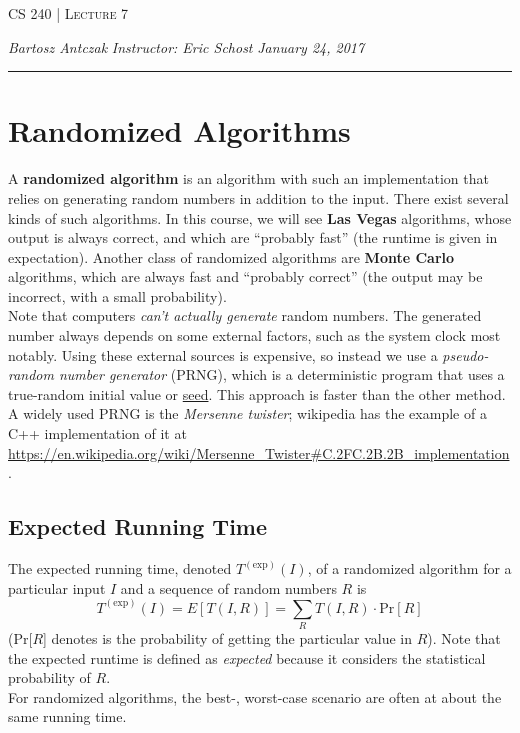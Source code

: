 \documentclass{report}
\newcommand{\lectureNum}{7}
\newcommand{\curDate}{January 24, 2017}
\newcommand{\course}{CS 240}
\begin{document}
\begin{center}
\begin{Large}
\textsc{\course{} | Lecture \lectureNum{}}
\end{Large}
\end{center} 
\noindent \textit{Bartosz Antczak} \hfill
\textit{Instructor: Eric Schost} \hfill
\textit{\curDate{}}
\rule{\textwidth}{0.4pt}

\section{Randomized Algorithms}
A \textbf{randomized algorithm} is an algorithm with such an implementation that relies on generating random numbers in addition to the input.
There exist several kinds of such algorithms. In this course, we will see {\bf Las Vegas} algorithms, whose output is 
always correct, and which are ``probably fast'' (the runtime is given in expectation). Another class of randomized 
algorithms are {\bf Monte Carlo} algorithms, which are always fast and ``probably correct'' (the output 
may be incorrect, with a small probability).\\


Note that computers \textit{can't actually generate} random
numbers. The generated number always depends on some external factors,
such as the system clock most notably. Using these external sources is
expensive, so instead we use a \textit{pseudo-random number generator}
(PRNG), which is a deterministic program that uses a true-random
initial value or \underline{seed}. This approach is faster than the
other method. A widely used PRNG is the {\it Mersenne twister}; 
wikipedia has the example of a C++ implementation of it at
\url{https://en.wikipedia.org/wiki/Mersenne_Twister#C.2FC.2B.2B_implementation}.



\subsection{Expected Running Time}
The expected running time, denoted $T^{(\mathrm{exp})}(I)$, of a randomized algorithm for a particular input $I$ and a sequence of random numbers $R$ is
$$T^{(\mathrm{exp})}(I) = E[T(I,R)] = \sum_{R} T(I, R) \cdot \mathrm{Pr}[R]$$
(Pr[$R$] denotes is the probability of getting the particular value in $R$). Note that the expected runtime is defined as \textit{expected} because it considers the statistical probability of $R$.\\
For randomized algorithms, the best-, worst-case scenario are often at about the same running time.
\end{document}
